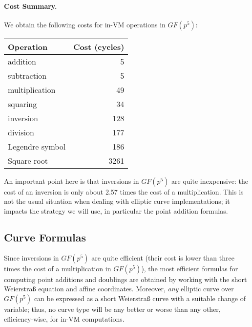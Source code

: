 \documentclass{llncs}
\newcommand{\GF}{GF}
\begin{document}
\paragraph{Cost Summary.} We obtain the following costs for in-VM
operations in $\GF(p^5)$:
\begin{center}
    \begin{tabular}{|l|r|}
        \hline
        \textsf{\textbf{Operation}} & \textsf{\textbf{Cost (cycles)}} \\
        \hline
        addition         &    5 \\
        subtraction      &    5 \\
        multiplication   &   49 \\
        squaring         &   34 \\
        inversion        &  128 \\
        division         &  177 \\
        Legendre symbol  &  186 \\
        Square root      & 3261 \\
        \hline
    \end{tabular}
\end{center}
An important point here is that inversions in $\GF(p^5)$ are quite
inexpensive: the cost of an inversion is only about 2.57 times the
cost of a multiplication. This is not the usual situation when
dealing with elliptic curve implementations; it impacts the strategy
we will use, in particular the point addition formulas.

\subsection{Curve Formulas}\label{sec:invm-curve-formulas}

Since inversions in $\GF(p^5)$ are quite efficient (their cost is lower
than three times the cost of a multiplication in $\GF(p^5)$), the most
efficient formulas for computing point additions and doublings are
obtained by working with the short Weierstraß equation and affine
coordinates. Moreover, \emph{any} elliptic curve over $\GF(p^5)$ can be
expressed as a short Weierstraß curve with a suitable change of
variable; thus, no curve type will be any better or worse than any
other, efficiency-wise, for in-VM computations.
\end{document}
